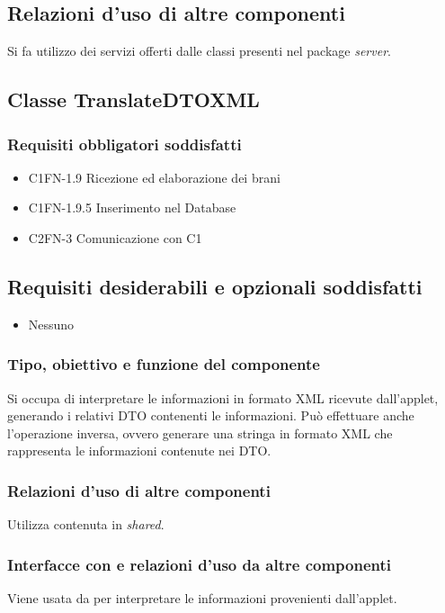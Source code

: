 \subsection*{Relazioni d'uso di altre componenti}
Si fa utilizzo dei servizi offerti dalle classi presenti nel package
\emph{server}.

\subsection{Classe TranslateDTOXML}
\subsubsection*{Requisiti obbligatori soddisfatti}
\begin{itemize}
    \item C1FN-1.9 Ricezione ed elaborazione dei brani
    \item C1FN-1.9.5 Inserimento nel Database
    \item C2FN-3 Comunicazione con C1
\end{itemize}
\subsection*{Requisiti desiderabili e opzionali soddisfatti}
\begin{itemize}
    \item Nessuno
\end{itemize}
\subsubsection*{Tipo, obiettivo e funzione del componente}
Si occupa di interpretare le informazioni in formato XML ricevute dall'applet,
generando i relativi DTO contenenti le informazioni. Pu\`o effettuare anche
l'operazione inversa, ovvero generare una stringa in formato XML che rappresenta
le informazioni contenute nei DTO.
\subsubsection*{Relazioni d'uso di altre componenti}
Utilizza  contenuta in \emph{shared}.
\subsubsection*{Interfacce con e relazioni d'uso da altre componenti}
Viene usata da  per interpretare le informazioni provenienti
dall'applet.
